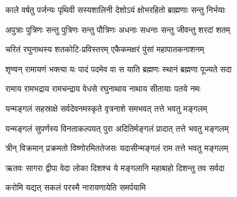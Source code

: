 \twolineshloka
{काले वर्षतु पर्जन्यः पृथिवी सस्यशालिनी}
{देशोऽयं क्षोभरहितो ब्राह्मणाः सन्तु निर्भयाः}

\twolineshloka
{अपुत्राः पुत्रिणः सन्तु पुत्रिणः सन्तु पौत्रिणः}
{अधनाः सधनाः सन्तु जीवन्तु शरदां शतम्}

\twolineshloka
{चरितं रघुनाथस्य शतकोटि-प्रविस्तरम्}
{एकैकमक्षरं पुंसां महापातकनाशनम्}

\twolineshloka
{शृण्वन् रामायणं भक्त्या यः पादं पदमेव वा}
{स याति ब्रह्मणः स्थानं ब्रह्मणा पूज्यते सदा}

\twolineshloka
{रामाय रामभद्राय रामचन्द्राय वेधसे}
{रघुनाथाय नाथाय सीतायाः पतये नमः}

\twolineshloka
{यन्मङ्गलं सहस्राक्षे सर्वदेवनमस्कृते}
{वृत्रनाशे समभवत् तत्ते भवतु मङ्गलम्}

\twolineshloka
{यन्मङ्गलं सुपर्णस्य विनताकल्पयत् पुरा}
{अदितिर्मङ्गलं प्रादात् तत्ते भवतु मङ्गलम्}

\twolineshloka
{त्रीन् विक्रमान् प्रक्रमतो विष्णोरमिततेजसः}
{यदासीन्मङ्गलं राम तत्ते भवतु मङ्गलम्}

\twolineshloka
{ऋतवः सागरा द्वीपा वेदा लोका दिशश्च ये}
{मङ्गलानि महाबाहो दिशन्तु तव सर्वदा}

{करोमि यद्यत् सकलं परस्मै नारायणायेति समर्पयामि}
